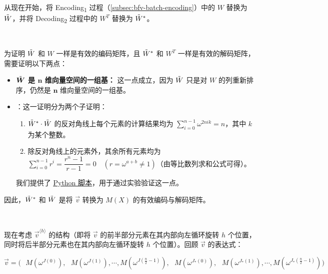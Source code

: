 $ $

$ $

从现在开始，将 \textsf{Encoding\textsubscript{1}} 过程（\autoref{subsec:bfv-batch-encoding}）中的 $W$ 替换为 $\tilde{W}$，并将 \textsf{Decoding\textsubscript{2}} 过程中的 $W^T$ 替换为 $\tilde{W}^*$。

$ $

为证明 $\tilde{W}$ 和 $W$ 一样是有效的编码矩阵，且 $\tilde{W}^*$ 和 $W^T$ 一样是有效的解码矩阵，需要证明以下两点：
\begin{itemize}[leftmargin=3\parindent]

\item \textbf{${\tilde{\bm W}}$ 是 $\bm{n}$ 维向量空间的一组基：} 这一点成立，因为 $\tilde{W}$ 只是对 $W$ 的列重新排序，仍然是 $\bm{n}$ 维向量空间的一组基。

\item {}：这一证明分为两个子证明：
\begin{enumerate}[leftmargin=2\parindent]
\item {} \boldmath$\tilde{ W}^{ *} \cdot \tilde{ W}$ 的反对角线上每个元素的计算结果均为 $\sum\limits_{i=0}^{n-1} \omega^{2nik} = n$，其中 $k$ 为某个整数。
\item {} 除反对角线上的元素外，其余所有元素均为 $\sum\limits_{i=0}^{n-1}r^i=\dfrac{r^n-1}{r-1}=0\quad(r=\omega^{a+b}\ne1)$（由等比数列求和公式可得）。
\end{enumerate}

我们提供了 \href{https://github.com/wang2000star/fhe-textbook-cn/blob/chinese-edition/source%20code/bfv_j_matrix_inverse_proof.py}{\underline{Python 脚本}}，用于通过实验验证这一点。

\end{itemize}




因此，$\tilde{W}^*$ 和 $\tilde{W}$ 是将 $\vec{v}$ 转换为 $M(X)$ 的有效编码与解码矩阵。

$ $

现在考虑 $\vec{v}^{\langle h \rangle}$ 的结构（即将 $\vec{v}$ 的前半部分元素在其内部向左循环旋转 $h$ 个位置，同时将后半部分元素也在其内部向左循环旋转 $h$ 个位置）。回顾 $\vec{v}$ 的表达式：

$\vec{v} = \bm{(} \text{ } 
M(\omega^{J(0)}), \text{ } M(\omega^{J(1)}), \cdots,  M(\omega^{J(\frac{n}{2}-1)}), \text{ } 
M(\omega^{J_*(0)}), \text{ } M(\omega^{J_*(1)}),  \cdots,  M(\omega^{J_*(\frac{n}{2}-1)}) \bm{)}$


